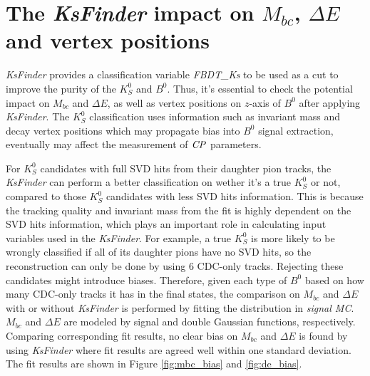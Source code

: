 \chapter{The \textit{KsFinder} impact on $M_{bc}$, $\Delta E$ and vertex positions}


\begin{comment}
\begin{figure}[htpb]
\centering
\texttt{[image: mbc-noks]}
\caption{$M_{bc}$ distribution in data(red) and MC(blue) without $K_S^0$ finder}
\end{figure}
\begin{figure}[htpb]
\centering
\texttt{[image: dE-noks]}
\caption{$\Delta{E}$ distribution in data(red) and MC(blue) without $K_S^0$ finder}
\end{figure}
\end{comment}
\textit{KsFinder} provides a classification variable \textit{FBDT\_Ks} to be used as a cut to improve the purity of the $K_S^0$ and $B^0$.
Thus, it's essential to check the potential impact on $M_{bc}$ and $\Delta E$, as well as vertex positions on $z$-axis of $B^0$ after applying \textit{KsFinder}. The $K_S^0$ classification uses information such as invariant mass and decay vertex positions which may propagate bias into $B^0$ signal extraction, eventually may affect the measurement of $\it{CP}$ parameters.

For $K_S^0$ candidates with full SVD hits from their daughter pion tracks, the \textit{KsFinder} can perform a better classification on wether it's a true $K_S^0$ or not, compared to those $K_S^0$ candidates with less SVD hits information. This is because the tracking quality and invariant mass from the fit is highly dependent on the SVD hits information, which plays an important role in calculating input variables used in the \textit{KsFinder}. For example, a true $K_S^0$ is more likely to be wrongly classified if all of its daughter pions have no SVD hits, so the reconstruction can only be done by using 6 CDC-only tracks. Rejecting these candidates might introduce biases. Therefore, given each type of $B^0$ based on how many CDC-only tracks it has in the final states, the comparison on $M_{bc}$ and $\Delta{E}$ with or without \textit{KsFinder} is performed by fitting the distribution in \textit{signal MC}. $M_{bc}$ and $\Delta{E}$ are modeled by signal and double Gaussian functions, respectively. Comparing corresponding fit results, no clear bias on $M_{bc}$ and $\Delta{E}$ is found by using \textit{KsFinder} where fit results are agreed well within one standard deviation. The fit results are shown in Figure \ref{fig:mbc_bias} and \ref{fig:de_bias}. 
 
